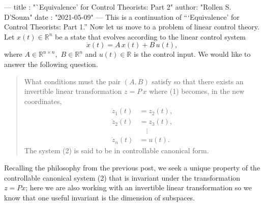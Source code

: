 ---
title :   "`Equivalence' for Control Theorists: Part 2"
author:   "Rollen S. D'Souza"
date  :   "2021-05-09"
---
This is a continuation of ```Equivalence' for Control Theorists: Part 1.''
Now let us move to a problem of linear control theory.
Let \(x(t) \in \mathbb{R}^n\) be a state that evolves according to the linear control system
\begin{equation}
  \label{eqn:system}
  \dot{x}(t) = A\, x(t) + B\, u(t),
\end{equation}
where \(A \in \mathbb{R}^{n\times n},\) \(B \in \mathbb{R}^n\) and \(u(t) \in \mathbb{R}\) is the control input.
We would like to answer the following question.
%
\begin{quote}
  What conditions must the pair \((A, B)\) satisfy so that there exists an invertible linear transformation \(z = P\, x\) where (1) becomes, in the new coordinates,
  \begin{equation}
  \label{eqn:controllablesystem}
  \begin{aligned}
    \dot{z}_1(t) &= z_2(t),\\
    \dot{z}_2(t) &= z_3(t),\\
                 &\quad\vdots \\
    \dot{z}_n(t) &= u(t).
  \end{aligned}
  \end{equation}
  The system (2) is said to be in controllable canonical form.
\end{quote}
%
Recalling the philosophy from the previous post, we seek a unique property of the controllable canonical system (2) that is invariant under the transformation \(z = P x\);
here we are also working with an invertible linear transformation so we know that one useful invariant is the dimension of subspaces.

